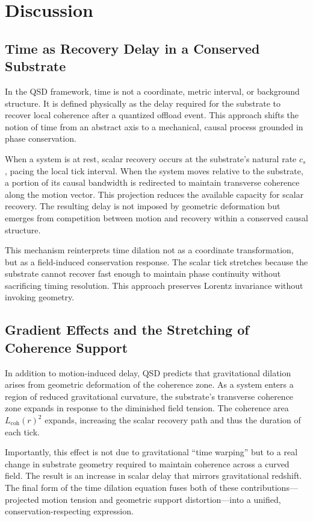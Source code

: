 \documentclass[entropy,article,submit,pdftex,moreauthors]{Definitions/mdpi}
\begin{document}
\section{Discussion}

\subsection{Time as Recovery Delay in a Conserved Substrate}

In the QSD framework, time is not a coordinate, metric interval, or background structure. It is defined physically as the delay required for the substrate to recover local coherence after a quantized offload event. This approach shifts the notion of time from an abstract axis to a mechanical, causal process grounded in phase conservation.

When a system is at rest, scalar recovery occurs at the substrate’s natural rate \( c_s \), pacing the local tick interval. When the system moves relative to the substrate, a portion of its causal bandwidth is redirected to maintain transverse coherence along the motion vector. This projection reduces the available capacity for scalar recovery. The resulting delay is not imposed by geometric deformation but emerges from competition between motion and recovery within a conserved causal structure.

This mechanism reinterprets time dilation not as a coordinate transformation, but as a field-induced conservation response. The scalar tick stretches because the substrate cannot recover fast enough to maintain phase continuity without sacrificing timing resolution. This approach preserves Lorentz invariance without invoking geometry.

\subsection{Gradient Effects and the Stretching of Coherence Support}

In addition to motion-induced delay, QSD predicts that gravitational dilation arises from geometric deformation of the coherence zone. As a system enters a region of reduced gravitational curvature, the substrate's transverse coherence zone expands in response to the diminished field tension. The coherence area \( L_{\text{coh}}(r)^2 \) expands, increasing the scalar recovery path and thus the duration of each tick.

Importantly, this effect is not due to gravitational ``time warping'' but to a real change in substrate geometry required to maintain coherence across a curved field. The result is an increase in scalar delay that mirrors gravitational redshift. The final form of the time dilation equation fuses both of these contributions—projected motion tension and geometric support distortion—into a unified, conservation-respecting expression.
\end{document}
